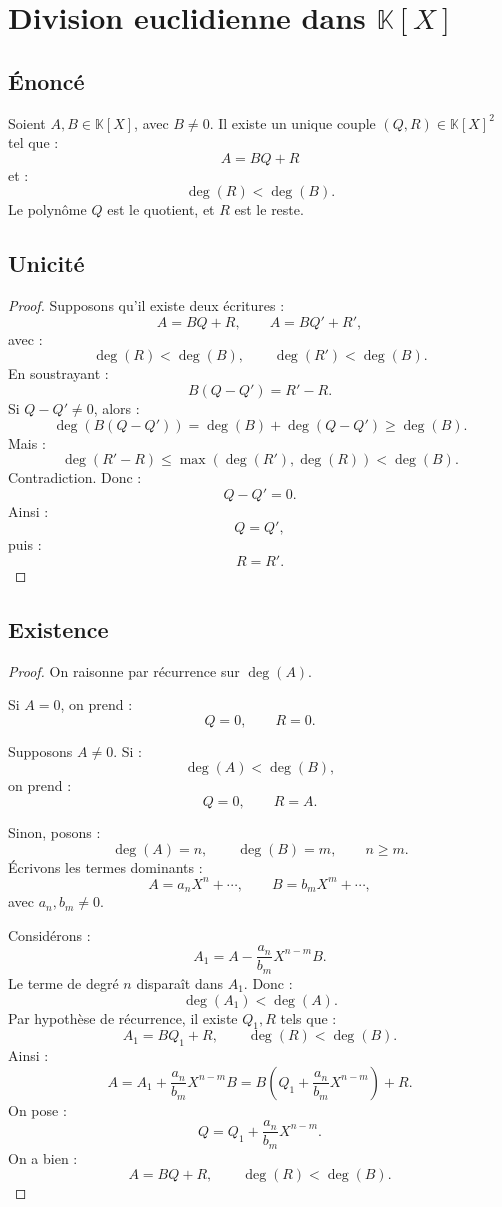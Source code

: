 \documentclass[11pt,a4paper]{article}
\newcommand{\K}{\mathbb K}
\begin{document}
\section{Division euclidienne dans \(\K[X]\)}

\subsection{Énoncé}

\begin{theorembox}
Soient \(A,B\in\K[X]\), avec \(B\neq0\).  
Il existe un unique couple \((Q,R)\in\K[X]^2\) tel que :
\[
A=BQ+R
\]
et :
\[
\deg(R)<\deg(B).
\]
Le polynôme \(Q\) est le quotient, et \(R\) est le reste.
\end{theorembox}

\subsection{Unicité}

\begin{proof}
Supposons qu'il existe deux écritures :
\[
A=BQ+R,
\qquad
A=BQ'+R',
\]
avec :
\[
\deg(R)<\deg(B),
\qquad
\deg(R')<\deg(B).
\]
En soustrayant :
\[
B(Q-Q')=R'-R.
\]
Si \(Q-Q'\neq0\), alors :
\[
\deg(B(Q-Q'))=\deg(B)+\deg(Q-Q')\geq\deg(B).
\]
Mais :
\[
\deg(R'-R)\leq\max(\deg(R'),\deg(R))<\deg(B).
\]
Contradiction.  
Donc :
\[
Q-Q'=0.
\]
Ainsi :
\[
Q=Q',
\]
puis :
\[
R=R'.
\]
\end{proof}

\subsection{Existence}

\begin{proof}
On raisonne par récurrence sur \(\deg(A)\).

Si \(A=0\), on prend :
\[
Q=0,\qquad R=0.
\]

Supposons \(A\neq0\).  
Si :
\[
\deg(A)<\deg(B),
\]
on prend :
\[
Q=0,\qquad R=A.
\]

Sinon, posons :
\[
\deg(A)=n,
\qquad
\deg(B)=m,
\qquad
n\geq m.
\]
Écrivons les termes dominants :
\[
A=a_nX^n+\cdots,
\qquad
B=b_mX^m+\cdots,
\]
avec \(a_n,b_m\neq0\).

Considérons :
\[
A_1=A-\frac{a_n}{b_m}X^{n-m}B.
\]
Le terme de degré \(n\) disparaît dans \(A_1\).  
Donc :
\[
\deg(A_1)<\deg(A).
\]
Par hypothèse de récurrence, il existe \(Q_1,R\) tels que :
\[
A_1=BQ_1+R,
\qquad
\deg(R)<\deg(B).
\]
Ainsi :
\[
A
=
A_1+\frac{a_n}{b_m}X^{n-m}B
=
B\left(Q_1+\frac{a_n}{b_m}X^{n-m}\right)+R.
\]
On pose :
\[
Q=Q_1+\frac{a_n}{b_m}X^{n-m}.
\]
On a bien :
\[
A=BQ+R,
\qquad
\deg(R)<\deg(B).
\]
\end{proof}
\end{document}
